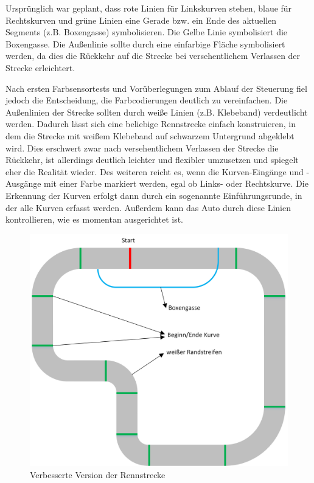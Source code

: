 \documentclass[a4paper,12pt]{article}                                         %
\numberwithin{table}{section}                               %
\numberwithin{figure}{section}                              %
\begin{document}
	Ursprünglich war geplant, dass rote Linien für Linkskurven stehen, blaue für Rechtskurven und grüne Linien eine Gerade bzw. ein Ende des aktuellen Segments (z.B. Boxengasse) symbolisieren. Die Gelbe Linie symbolisiert die Boxengasse. Die Außenlinie sollte durch eine einfarbige Fläche symbolisiert werden, da dies die Rückkehr auf die Strecke bei versehentlichem Verlassen der Strecke erleichtert.
	
	\bigskip
	Nach ersten Farbsensortests und Vorüberlegungen zum Ablauf der Steuerung fiel jedoch die Entscheidung, die Farbcodierungen deutlich zu vereinfachen. Die Außenlinien der Strecke sollten durch weiße Linien (z.B. Klebeband) verdeutlicht werden. Dadurch lässt sich eine beliebige Rennstrecke einfach konstruieren, in dem die Strecke mit weißem Klebeband auf schwarzem Untergrund abgeklebt wird. Dies erschwert zwar nach versehentlichem Verlassen der Strecke die Rückkehr, ist allerdings deutlich leichter und flexibler umzusetzen und spiegelt eher die Realität wieder. Des weiteren reicht es, wenn die Kurven-Eingänge und -Ausgänge mit einer Farbe markiert werden, egal ob Links- oder Rechtskurve. Die Erkennung der Kurven erfolgt dann durch ein sogenannte Einführungsrunde, in der alle Kurven erfasst werden. Außerdem kann das Auto durch diese Linien kontrollieren, wie es momentan ausgerichtet ist.
	
		\begin{figure}[h]
		\begin{center}
					\includegraphics{../Bilder/RennstreckeBesser.png}
					\end{center}
					\caption{Verbesserte Version der Rennstrecke} 
				\end{figure}
	
\end{document}
